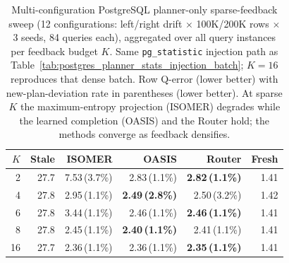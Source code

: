 \begin{table}[t]
  \centering\small
  \caption{Multi-configuration PostgreSQL planner-only sparse-feedback sweep (12 configurations: left/right drift $\times$ 100K/200K rows $\times$ 3 seeds, 84 queries each), aggregated over all query instances per feedback budget $K$. Same \texttt{pg\_statistic} injection path as Table~\ref{tab:postgres_planner_stats_injection_batch}; $K{=}16$ reproduces that dense batch. Row Q-error (lower better) with new-plan-deviation rate in parentheses (lower better). At sparse $K$ the maximum-entropy projection (ISOMER) degrades while the learned completion (OASIS) and the Router hold; the methods converge as feedback densifies.}
  \label{tab:postgres_sparse_multiconfig}
  \setlength{\tabcolsep}{5pt}
  \begin{tabular}{r rrrr r}
    \toprule
    $K$ & Stale & ISOMER & OASIS & Router & Fresh \\
    \midrule
    2 & 27.7 & 7.53\,(3.7\%) & 2.83\,(1.1\%) & \textbf{2.82\,(1.1\%)} & 1.41 \\
    4 & 27.8 & 2.95\,(1.1\%) & \textbf{2.49\,(2.8\%)} & 2.50\,(3.2\%) & 1.42 \\
    6 & 27.8 & 3.44\,(1.1\%) & 2.46\,(1.1\%) & \textbf{2.46\,(1.1\%)} & 1.41 \\
    8 & 27.8 & 2.45\,(1.1\%) & \textbf{2.40\,(1.1\%)} & 2.41\,(1.1\%) & 1.41 \\
    16 & 27.7 & 2.36\,(1.1\%) & 2.36\,(1.1\%) & \textbf{2.35\,(1.1\%)} & 1.41 \\
    \bottomrule
  \end{tabular}
\end{table}
